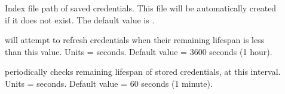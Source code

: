 \begin{description}
\item[]
\label{param:CredIndexFile}   Index file path of saved credentials.
This file will be automatically created if it does not exist.
The default value is
.

\item[]
\label{param:DefaultCredExpireThreshold}   will attempt
to refresh credentials when their remaining lifespan is less than this
value.
Units = seconds.  Default value = 3600 seconds (1 hour).

\item[]
\label{param:CredCheckInterval}  periodically checks
remaining lifespan of stored credentials, at this interval.
Units = seconds.  Default value = 60 seconds (1 minute).

\end{description}

